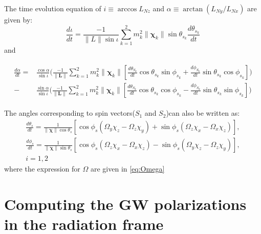 \documentclass[prd,preprintnumbers,twocolumn,eqsecnum,floatfix,letter]{revtex4}
\begin{document}
The time evolution equation of $i \equiv \arccos L_{Nz}$ and $ \alpha \equiv \arctan (L_{Ny}/L_{Nx})$ are given by:
\begin{equation}
\frac{d\iota}{dt} = \frac{-1}{\|L\| \sin\iota}\sum\limits_{k = 1}^{2}m^2_{k}\| \boldsymbol{\chi}_{k}\|\sin\theta_{s_{k}}\frac{d\theta_{s_{k}}}{dt}
\end{equation}  
and
\begin{widetext}
\begin{align}
\begin{split}
\frac{d\alpha}{dt} =& \frac{\cos\alpha}{\sin\iota}\Bigg(\frac{-1}{\|\boldsymbol{L}\|}\sum\limits_{k = 1}^{2} m^{2}_{k}\|\boldsymbol{{\chi}}_{k}\|\left[\frac{d\theta_{S_{k}}}{dt}\cos\theta_{s_{k}}\sin\phi_{s_{k}} + \frac{d\phi_{S_{k}}}{dt}\sin\theta_{s_{k}}\cos\phi_{s_{k}}\right]\Bigg) \\ 
- & \frac{\sin\alpha}{\sin\iota}\Bigg(\frac{-1}{\|\boldsymbol{L}\|}\sum\limits_{k = 1}^{2} m^{2}_{k}\|\boldsymbol{{\chi}}_{k}\|\left[\frac{d\theta_{S_{k}}}{dt}\cos\theta_{s_{k}}\cos\phi_{s_{k}} - \frac{d\phi_{S_{k}}}{dt}\sin\theta_{s_{k}}\sin\phi_{s_{k}}\right]\Bigg)
\end{split}
\end{align}
 \end{widetext}

 The angles corresponding to spin vectors($S_{1}$ and $S_{2}$)can also be written as:
 \begin{eqnarray}
 \frac{d\theta_{s}}{dt} = \frac{1}{\|\boldsymbol{\chi}\|\cos\theta_{s}}\left[
 \cos\phi_{s}(\Omega_{y}\chi_{z}-\Omega_{z}\chi_{y}) + \sin\phi_{s}(\Omega_{z}\chi_{x}-\Omega_{x}\chi_{z}) \right], \nonumber \\ 
  \frac{d\phi_{s}}{dt} = \frac{1}{\|\boldsymbol{\chi}\|\sin\theta_{s}}\left[
  \cos\phi_{s}(\Omega_{z}\chi_{x}-\Omega_{x}\chi_{z}) - \sin\phi_{s}(\Omega_{y}\chi_{z}-\Omega_{z}\chi_{y}) \right], \nonumber \\ 
i = 1,2 \end{eqnarray}
where the expression for $\Omega$ are given in \ref{eq:Omega} 


\section{Computing the GW polarizations in the radiation frame}
\end{document}

